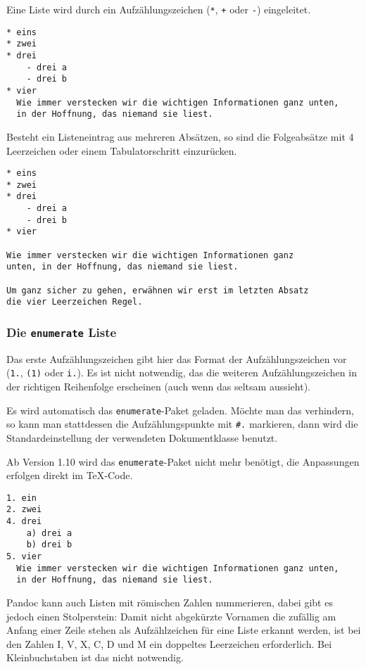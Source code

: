 \documentclass[11pt,ngerman,a4paper]{article}
\begin{document}
Eine Liste wird durch ein Aufzählungszeichen (\texttt{*}, \texttt{+}
oder \texttt{-}) eingeleitet.

\begin{verbatim}
* eins
* zwei
* drei
    - drei a
    - drei b
* vier
  Wie immer verstecken wir die wichtigen Informationen ganz unten,
  in der Hoffnung, das niemand sie liest.
\end{verbatim}

Besteht ein Listeneintrag aus mehreren Absätzen, so sind die
Folgeabsätze mit 4 Leerzeichen oder einem Tabulatorschritt einzurücken.

\begin{verbatim}
* eins
* zwei
* drei
    - drei a
    - drei b
* vier

Wie immer verstecken wir die wichtigen Informationen ganz
unten, in der Hoffnung, das niemand sie liest.
    
Um ganz sicher zu gehen, erwähnen wir erst im letzten Absatz
die vier Leerzeichen Regel.
\end{verbatim}

\subsubsection{Die \texttt{enumerate} Liste}

Das erste Aufzählungszeichen gibt hier das Format der Aufzählungszeichen
vor (\texttt{1.}, \texttt{(1)} oder \texttt{i.}). Es ist nicht
notwendig, das die weiteren Aufzählungszeichen in der richtigen
Reihenfolge erscheinen (auch wenn das seltsam aussieht).

Es wird automatisch das \texttt{enumerate}-Paket geladen. Möchte man das
verhindern, so kann man stattdessen die Aufzählungspunkte mit
\texttt{\#.} markieren, dann wird die Standardeinstellung der
verwendeten Dokumentklasse benutzt.

Ab Version 1.10 wird das \texttt{enumerate}-Paket nicht mehr benötigt,
die Anpassungen erfolgen direkt im TeX-Code.

\begin{verbatim}
1. ein
2. zwei
4. drei
    a) drei a
    b) drei b
5. vier
  Wie immer verstecken wir die wichtigen Informationen ganz unten,
  in der Hoffnung, das niemand sie liest.
\end{verbatim}

Pandoc kann auch Listen mit römischen Zahlen nummerieren, dabei gibt es
jedoch einen Stolperstein: Damit nicht abgekürzte Vornamen die zufällig
am Anfang einer Zeile stehen als Aufzählzeichen für eine Liste erkannt
werden, ist bei den Zahlen I, V, X, C, D und M ein doppeltes Leerzeichen
erforderlich. Bei Kleinbuchstaben ist das nicht notwendig.
\end{document}
